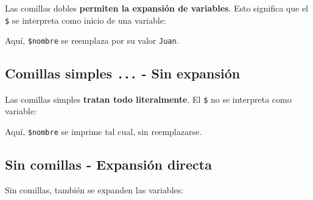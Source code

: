 \documentclass[
  spanish,
  12pt,
  letterpaper,
  DIV=11,
  numbers=noendperiod]{scrreprt}
\newenvironment{Shaded}{\begin{snugshade}}{\end{snugshade}}
\newcommand{\BuiltInTok}[1]{\textcolor[rgb]{0.00,0.23,0.31}{#1}}
\newcommand{\CommentTok}[1]{\textcolor[rgb]{0.37,0.37,0.37}{#1}}
\newcommand{\NormalTok}[1]{\textcolor[rgb]{0.00,0.23,0.31}{#1}}
\newcommand{\OperatorTok}[1]{\textcolor[rgb]{0.37,0.37,0.37}{#1}}
\newcommand{\StringTok}[1]{\textcolor[rgb]{0.13,0.47,0.30}{#1}}
\newcommand{\VariableTok}[1]{\textcolor[rgb]{0.07,0.07,0.07}{#1}}
\begin{document}
Las comillas dobles \textbf{permiten la expansión de variables}. Esto
significa que el \texttt{\$} se interpreta como inicio de una variable:

\begin{Shaded}
\end{Shaded}

Aquí, \texttt{\$nombre} se reemplaza por su valor \texttt{Juan}.

\subsection{\texorpdfstring{Comillas simples
\texttt{\textquotesingle{}...\textquotesingle{}} - Sin
expansión}{Comillas simples \textquotesingle...\textquotesingle{} - Sin expansión}}\label{comillas-simples-...---sin-expansiuxf3n}

Las comillas simples \textbf{tratan todo literalmente}. El \texttt{\$}
no se interpreta como variable:

\begin{Shaded}
\end{Shaded}

Aquí, \texttt{\$nombre} se imprime tal cual, sin reemplazarse.

\subsection{Sin comillas - Expansión
directa}\label{sin-comillas---expansiuxf3n-directa}

Sin comillas, también se expanden las variables:

\begin{Shaded}
\end{Shaded}
\end{document}
